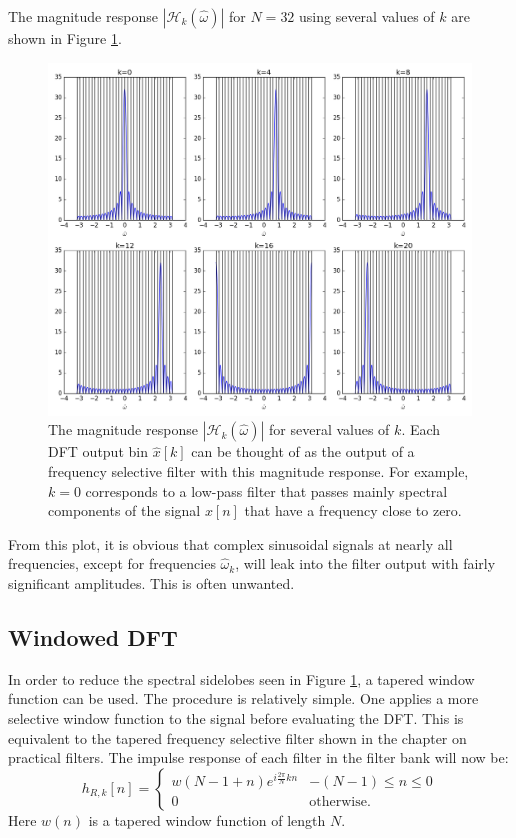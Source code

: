 The magnitude response $|\mathcal{H}_{k}(\hat{\omega})|$ for $N=32$
using several values of $k$ are shown in Figure \ref{fig:dft_freq_resp}.
\begin{figure}
    \begin{center}
        \includegraphics[width=\textwidth]{ch16/figures/fft_freqresp.png}
    \end{center}
    \caption{The magnitude response $|\mathcal{H}_k(\hat{\omega})|$ for several values of $k$. 
        Each DFT output bin $\hat{x}[k]$ can be thought of as the output of a frequency selective 
        filter with this magnitude response. For example, $k=0$ corresponds to a low-pass filter 
        that passes mainly spectral components of the signal $x[n]$ that have a frequency close to zero.}
    \label{fig:dft_freq_resp}
\end{figure}

From this plot, it is obvious that complex sinusoidal signals at
nearly all frequencies, except for frequencies $\hat{\omega}_{k}$, will
leak into the filter output with fairly significant amplitudes. This
is often unwanted.

\subsection{Windowed DFT}

In order to reduce the spectral sidelobes seen in
Figure \ref{fig:dft_freq_resp}, a tapered window function can be
used. The procedure is relatively simple. One applies a more selective
window function to the signal before evaluating the DFT. This is
equivalent to the tapered frequency selective filter shown in the
chapter on practical filters. The impulse response of each filter in
the filter bank will now be:
\begin{equation}
    h_{R,k}[n] =\left\{ \begin{array}{cc}
        w(N-1 + n)e^{i \frac{2\pi}{N}k n} & -(N-1) \le n \le 0  \\
        0                                 & \mathrm{otherwise}.
    \end{array}
    \right.
\end{equation}
Here $w(n)$ is a tapered window function of length $N$.

